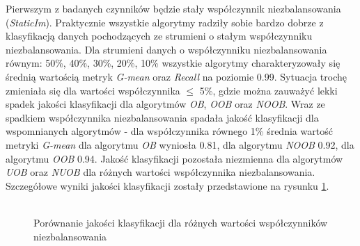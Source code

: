\noindent Pierwszym z badanych czynników będzie stały współczynnik niezbalansowania (\textit{StaticIm}). Praktycznie wszystkie algorytmy radziły sobie bardzo dobrze z klasyfikacją danych pochodzących ze strumieni o stałym współczynniku niezbalansowania. Dla strumieni danych o współczynniku niezbalansowania równym: 50\%, 40\%, 30\%, 20\%, 10\% wszystkie algorytmy charakteryzowały się średnią wartością metryk \textit{G-mean} oraz \textit{Recall} na poziomie 0.99. Sytuacja trochę zmieniała się dla wartości współczynnika $\leq$ 5\%, gdzie można zauważyć lekki spadek jakości klasyfikacji dla algorytmów \textit{OB}, \textit{OOB} oraz \textit{NOOB}. Wraz ze spadkiem współczynnika niezbalansowania spadała jakość klasyfikacji dla wspomnianych algorytmów - dla współczynnika równego 1\% średnia wartość metryki \textit{G-mean} dla algorytmu \textit{OB} wyniosła 0.81, dla algorytmu \textit{NOOB} 0.92, dla algorytmu \textit{OOB} 0.94. Jakość klasyfikacji pozostała niezmienna dla algorytmów \textit{UOB} oraz \textit{NUOB} dla różnych wartości współczynnika niezbalansowania. Szczegółowe wyniki jakości klasyfikacji zostały przedstawione na rysunku \ref{Figure:StaticImbalance}.\\\\

\begin{figure}[h]
    \centering
    \qquad
    \caption{Porównanie jakości klasyfikacji dla różnych wartości współczynników niezbalansowania}\label{Figure:StaticImbalance}
\end{figure}

